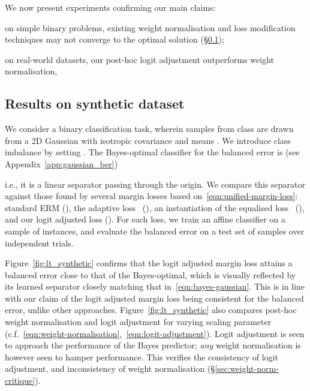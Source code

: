 We now present experiments confirming our main claims:
\begin{enumerate*}[label=(\roman*),itemsep=0pt,topsep=0pt,leftmargin=16pt]
    \item on simple binary problems, existing weight normalisation and loss modification techniques 
    may not converge to the optimal solution (\S\ref{sec:synth-expt});
    
    \item on real-world datasets, 
    our post-hoc logit adjustment 
    outperforms weight normalisation,
\end{enumerate*}

\subsection{Results on synthetic dataset}
\label{sec:synth-expt}

We 
consider 
a binary classification task,
wherein samples from class  are drawn from a 2D Gaussian
with 
isotropic covariance
and means .
We introduce class imbalance by setting .
The Bayes-optimal classifier 
for the balanced error is (see Appendix~\ref{app:gaussian_ber})

i.e., it is a linear separator passing through the origin.
We compare this separator against those found by 
several 
margin
losses
based on~\eqref{eqn:unified-margin-loss}:
standard ERM (),
the adaptive loss~\citep{Cao:2019} (),
an instantiation of the equalised loss~\citep{Tan:2020} (),
and our logit adjusted loss ().
For each loss, we train an affine classifier on a sample of  instances,
and evaluate the balanced error on a test set of  samples
over  independent trials.

Figure~\ref{fig:lt_synthetic} confirms that 
the logit adjusted margin loss attains a balanced error close to that of the Bayes-optimal,
which is visually reflected by its learned separator closely matching that in~\eqref{eqn:bayes-gaussian}.
This is in line with our claim of the logit adjusted margin loss being consistent for the balanced error, unlike other approaches.
Figure~\ref{fig:lt_synthetic} also compares post-hoc weight normalisation and logit adjustment
for varying scaling parameter  (c.f.~\eqref{eqn:weight-normalisation},~\eqref{eqn:logit-adjustment}).
Logit adjustment is seen to approach the performance of the Bayes predictor;
\emph{any} weight normalisation is however seen to hamper performance.
This verifies the consistency of logit adjustment,
and inconsistency of weight normalisation (\S\ref{sec:weight-norm-critique}).

